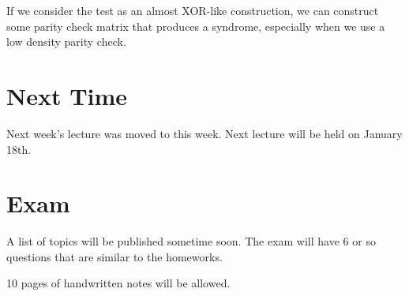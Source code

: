 \documentclass{idc_msc}
\begin{document}
If we consider the test as an almost XOR-like construction, we can construct some parity check matrix that produces a syndrome, especially when we use a low density parity check.

\section{Next Time}

Next week's lecture was moved to this week. Next lecture will be held on January 18th.

\section{Exam}

A list of topics will be published sometime soon.
The exam will have 6 or so questions that are similar to the homeworks.

10 pages of handwritten notes will be allowed.
\end{document}
